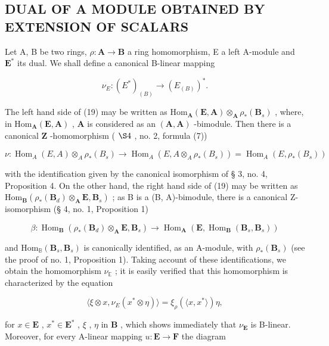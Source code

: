 \subsection{DUAL OF A MODULE OBTAINED BY EXTENSION OF SCALARS}

Let A, B be two rings, \(\rho: \mathbf{A} \to \mathbf{B}\) a ring homomorphism, E a left A-module and \(\mathbf{E}^*\) its dual. We shall define a canonical B-linear mapping

\[
\nu _ {E}: (E ^ {*}) _ {(B)} \rightarrow (E _ {(B)}) ^ {*}.\tag{19}
\]

The left hand side of (19) may be written as \(\mathrm{Hom}_{\mathbf{A}}(\mathbf{E},\mathbf{A})\otimes_{\mathbf{A}}\rho_{*}(\mathbf{B}_{s})\) , where, in \(\mathrm{Hom}_{\mathbf{A}}(\mathbf{E},\mathbf{A})\) , \(\mathbf{A}\) is considered as an \((\mathbf{A},\mathbf{A})\) -bimodule. Then there is a canonical \(\mathbf{Z}\) -homomorphism ( \(\S 4\) , no. 2, formula (7))

\[
\nu: \operatorname{Hom} _ {A} (E, A) \otimes_ {A} \rho_ {*} (B _ {s}) \rightarrow \operatorname{Hom} _ {A} (E, A \otimes_ {A} \rho_ {*} (B _ {s})) = \operatorname{Hom} _ {A} (E, \rho_ {*} (B _ {s}))
\]

with the identification given by the canonical isomorphism of § 3, no. 4, Proposition 4. On the other hand, the right hand side of (19) may be written as \(\mathrm{Hom}_{\mathbf{B}}(\rho_{*}(\mathbf{B}_{d}) \otimes_{\mathbf{A}} \mathbf{E}, \mathbf{B}_{s})\) ; as B is a (B, A)-bimodule, there is a canonical Z-isomorphism (§ 4, no. 1, Proposition 1)

\[
\beta : \operatorname{Hom} _ {\mathbf {B}} (\rho_ {*} (\mathbf {B} _ {d}) \otimes_ {\mathbf {A}} \mathbf {E}, \mathbf {B} _ {s}) \rightarrow \operatorname{Hom} _ {\mathbf {A}} (\mathbf {E}, \operatorname{Hom} _ {\mathbf {B}} (\mathbf {B} _ {s}, \mathbf {B} _ {s}))
\]

and \(\mathrm{Hom}_{\mathbb{B}}(\mathbf{B}_s,\mathbf{B}_s)\) is canonically identified, as an A-module, with \(\rho_{*}(\mathbf{B}_{s})\) (see the proof of no. 1, Proposition 1). Taking account of these identifications, we obtain the homomorphism \(\nu_{\mathbb{E}}\) ; it is easily verified that this homomorphism is characterized by the equation

\[
\langle \xi \otimes x, \nu _ {E} (x ^ {*} \otimes \eta) \rangle = \xi_ {\rho} (\langle x, x ^ {*} \rangle) \eta ,\tag{20}
\]

for \(x \in \mathbf{E}\) , \(x^{*} \in \mathbf{E}^{*}\) , \(\xi\) , \(\eta\) in \(\mathbf{B}\) , which shows immediately that \(\nu_{\mathbf{E}}\) is B-linear. Moreover, for every A-linear mapping \(u: \mathbf{E} \to \mathbf{F}\) the diagram

